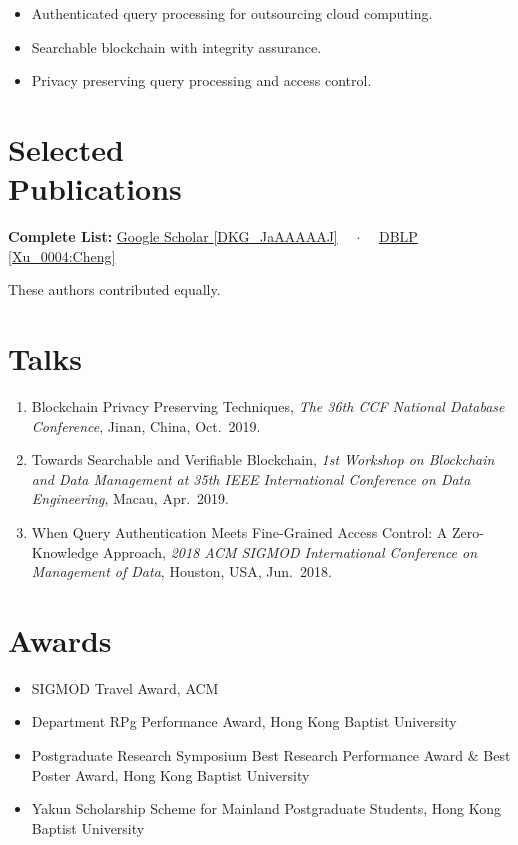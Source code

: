 \documentclass{mycv}
\begin{document}
\begin{itemize}
  \item Authenticated query processing for outsourcing cloud computing.
  \item Searchable blockchain with integrity assurance.
  \item Privacy preserving query processing and access control.
\end{itemize}

\section{Selected \\ Publications}%

\textbf{Complete List:}
\href{https://scholar.google.com/citations?user=DKG_JaAAAAAJ}{Google Scholar \textsf{\footnotesize [DKG\_JaAAAAAJ]}}%
{~~$\cdot$~~}%
\href{https://dblp.org/pers/hd/x/Xu_0004:Cheng}{DBLP \textsf{\footnotesize [Xu\_0004:Cheng]}}%


{
\footnotesize%
\textsuperscript{\textdagger}These authors contributed equally.
}

\section{Talks}

\begin{enumerate}
  \item Blockchain Privacy Preserving Techniques, \emph{The 36th CCF National Database Conference}, Jinan, China, Oct.~2019.
  \item Towards Searchable and Verifiable Blockchain, \emph{1st Workshop on Blockchain and Data Management at 35th IEEE International Conference on Data Engineering}, Macau, Apr.~2019.
  \item When Query Authentication Meets Fine-Grained Access Control: A Zero-Knowledge Approach, \emph{2018 ACM SIGMOD International Conference on Management of Data}, Houston, USA, Jun.~2018.
\end{enumerate}

\section{Awards}

\begin{itemize}
  \item SIGMOD Travel Award, ACM 
  \item Department RPg Performance Award, Hong Kong Baptist University 
  \item Postgraduate Research Symposium Best Research Performance Award \& Best Poster Award, Hong Kong Baptist University 
  \item Yakun Scholarship Scheme for Mainland Postgraduate Students, Hong Kong Baptist University 
\end{itemize}
\end{document}

